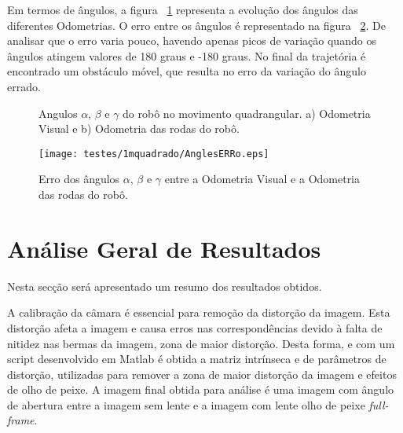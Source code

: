 Em termos de ângulos, a figura ~\ref{fig:ang1mquadrado} representa a evolução dos ângulos das diferentes Odometrias. O erro entre os ângulos é representado na figura ~\ref{fig:anglesERROquad}. De analisar que o erro varia pouco, havendo apenas picos de variação quando os ângulos atingem valores de 180 graus e -180 graus. No final da trajetória é encontrado um obstáculo móvel, que resulta no erro da variação do ângulo errado. 


\begin{figure}[h!]
	\centering
	\qquad
	\caption{Angulos $\alpha$, $\beta$ e $\gamma$ do robô  no movimento quadrangular. a) Odometria Visual e b) Odometria das rodas do robô.}
	\label{fig:ang1mquadrado}
\end{figure}

\begin{figure}[h!]
	\begin{center}
		\leavevmode		
		\texttt{[image: testes/1mquadrado/AnglesERRo.eps]}
		\caption{Erro dos ângulos $\alpha$, $\beta$ e $\gamma$ entre a Odometria Visual e a Odometria das rodas do robô.}
		\label{fig:anglesERROquad}
	\end{center}
\end{figure}





\section{Análise Geral de Resultados}


Nesta secção será apresentado um resumo dos resultados obtidos. 

A calibração da câmara é essencial para remoção da distorção da imagem. Esta distorção afeta a imagem e causa erros nas correspondências devido à falta de nitidez nas bermas da imagem, zona de maior distorção. Desta forma, e com um script desenvolvido em Matlab é obtida a matriz intrínseca e de parâmetros de distorção, utilizadas para remover a zona de maior distorção da imagem e efeitos de olho de peixe. A imagem final obtida para análise é uma imagem com ângulo de abertura entre a imagem sem lente e a imagem com lente olho de peixe \textit{full-frame}. 


